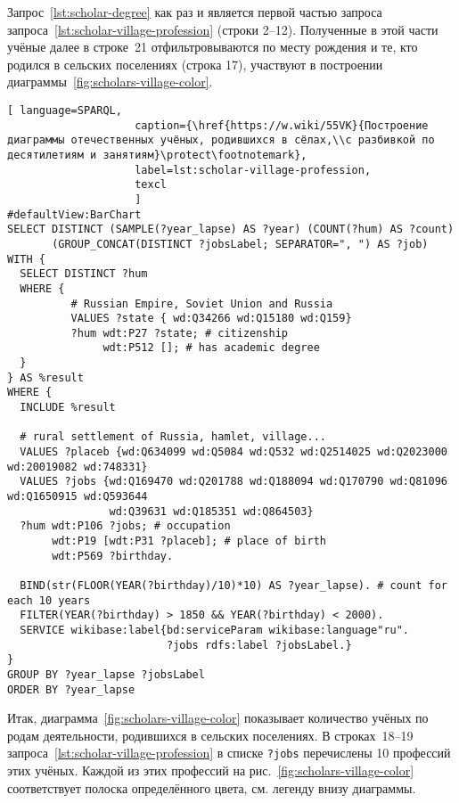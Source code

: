 Запрос~\ref{lst:scholar-degree} как раз и является 
первой частью запроса запроса~\ref{lst:scholar-village-profession} (строки 2--12). 
Полученные в этой части учёные далее в строке~21 
отфильтровываются по месту рождения и те, кто родился в сельских поселениях (строка 17), 
участвуют в построении диаграммы~\ref{fig:scholars-village-color}.

\begin{fullwidth}
\begin{lstlisting}[ language=SPARQL, 
                    caption={\href{https://w.wiki/55VK}{Построение диаграммы отечественных учёных, родившихся в сёлах,\\с разбивкой по десятилетиям и занятиям}\protect\footnotemark},
                    label=lst:scholar-village-profession,
                    texcl 
                    ]
#defaultView:BarChart
SELECT DISTINCT (SAMPLE(?year_lapse) AS ?year) (COUNT(?hum) AS ?count) 
       (GROUP_CONCAT(DISTINCT ?jobsLabel; SEPARATOR=", ") AS ?job) 
WITH {
  SELECT DISTINCT ?hum 
  WHERE {
          # Russian Empire, Soviet Union and Russia
          VALUES ?state { wd:Q34266 wd:Q15180 wd:Q159}
          ?hum wdt:P27 ?state; # citizenship
               wdt:P512 []; # has academic degree 
  }
} AS %result
WHERE {
  INCLUDE %result

  # rural settlement of Russia, hamlet, village...
  VALUES ?placeb {wd:Q634099 wd:Q5084 wd:Q532 wd:Q2514025 wd:Q2023000 wd:20019082 wd:748331}
  VALUES ?jobs {wd:Q169470 wd:Q201788 wd:Q188094 wd:Q170790 wd:Q81096 wd:Q1650915 wd:Q593644 
                wd:Q39631 wd:Q185351 wd:Q864503}
  ?hum wdt:P106 ?jobs; # occupation
       wdt:P19 [wdt:P31 ?placeb]; # place of birth
       wdt:P569 ?birthday.
  
  BIND(str(FLOOR(YEAR(?birthday)/10)*10) AS ?year_lapse). # count for each 10 years
  FILTER(YEAR(?birthday) > 1850 && YEAR(?birthday) < 2000).
  SERVICE wikibase:label{bd:serviceParam wikibase:language"ru".
                         ?jobs rdfs:label ?jobsLabel.}
}
GROUP BY ?year_lapse ?jobsLabel
ORDER BY ?year_lapse
\end{lstlisting}%
\end{fullwidth}

Итак, диаграмма~\ref{fig:scholars-village-color} показывает количество учёных по родам деятельности, 
родившихся в сельских поселениях. 
В строках~18--19 запроса~\ref{lst:scholar-village-profession} 
в списке \lstinline|?jobs| перечислены 10 профессий этих учёных. 
%
%
Каждой из этих профессий на рис.~\ref{fig:scholars-village-color} 
соответствует полоска определённого цвета, см. легенду внизу диаграммы. 


